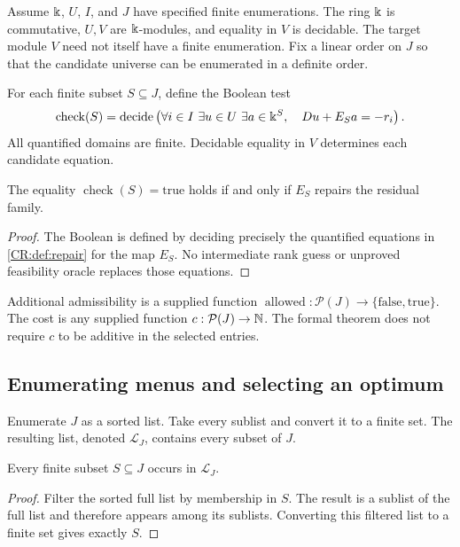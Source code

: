Assume $\Bbbk$, $U$, $I$, and $J$ have specified finite enumerations. The ring $\Bbbk$ is commutative, $U,V$ are $\Bbbk$-modules, and equality in $V$ is decidable. The target module $V$ need not itself have a finite enumeration. Fix a linear order on $J$ so that the candidate universe can be enumerated in a definite order.

For each finite subset $S\subseteq J$, define the Boolean test
\begin{equation}\label{CR:eq:boolean-check}
\operatorname{check}(S)=\operatorname{decide}\left(
\forall i\in I\ \exists u\in U\ \exists a\in\Bbbk^S,\quad Du+E_Sa=-r_i
\right).
\end{equation}
All quantified domains are finite. Decidable equality in $V$ determines each candidate equation.

\begin{CRproposition}\label{CR:prop:check}
The equality $\operatorname{check}(S)=\mathrm{true}$ holds if and only if $E_S$ repairs the residual family.
\end{CRproposition}
\begin{proof}
The Boolean is defined by deciding precisely the quantified equations in \cref{CR:def:repair} for the map $E_S$. No intermediate rank guess or unproved feasibility oracle replaces those equations.
\end{proof}

Additional admissibility is a supplied function $\operatorname{allowed}:\mathcal P(J)\to\{\mathrm{false},\mathrm{true}\}$. The cost is any supplied function $c:\mathcal P(J)\to\mathbb{N}$. The formal theorem does not require $c$ to be additive in the selected entries.

\subsection{Enumerating menus and selecting an optimum}
Enumerate $J$ as a sorted list. Take every sublist and convert it to a finite set. The resulting list, denoted $\mathcal L_J$, contains every subset of $J$.

\begin{CRlemma}\label{CR:lem:allmenus}
Every finite subset $S\subseteq J$ occurs in $\mathcal L_J$.
\end{CRlemma}
\begin{proof}
Filter the sorted full list by membership in $S$. The result is a sublist of the full list and therefore appears among its sublists. Converting this filtered list to a finite set gives exactly $S$.
\end{proof}

